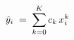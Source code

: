 \documentclass[preview]{standalone}
\begin{document}
\begin{align*}
\special{dvisvgm:raw <g id='unique000'>}\hat{y}_i \;=\; \sum_{k=0}^{K} c_k\, x_i^k\special{dvisvgm:raw </g>}
\end{align*}
\end{document}
